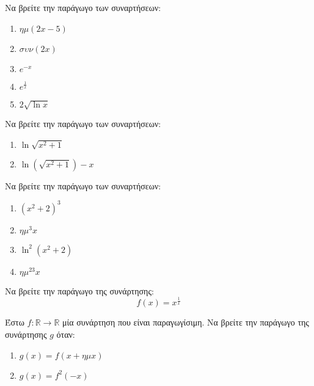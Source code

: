 \documentclass{presentation}
\begin{document}
\begin{askisi}
  Να βρείτε την παράγωγο των συναρτήσεων:
  \begin{enumerate}
    \item<1-> $ημ(2x-5)$
    \item<2-> $συν(2x)$
    \item<3-> $e^{-x}$
    \item<4-> $e^{\frac{1}{x}}$
    \item<5-> $2\sqrt{\ln x}$
  \end{enumerate}

\end{askisi}

\begin{askisi}
  Να βρείτε την παράγωγο των συναρτήσεων:
  \begin{enumerate}
    \item<1-> $\ln \sqrt{x^2+1}$
    \item<2-> $\ln(\sqrt{x^2+1})-x$
  \end{enumerate}

\end{askisi}

\begin{askisi}
  Να βρείτε την παράγωγο των συναρτήσεων:
  \begin{enumerate}
    \item<1-> $(x^2+2)^3$
    \item<2-> $ημ^3x$
    \item<3-> $\ln^2(x^2+2)$
    \item<4-> $ημ^23x$
  \end{enumerate}

\end{askisi}

\begin{askisi}
  Να βρείτε την παράγωγο της συνάρτησης:
  $$f(x)=x^{\frac{1}{x}}$$

\end{askisi}

\begin{askisi}
  Έστω $f:\mathbb{R}\to\mathbb{R}$ μία συνάρτηση που είναι παραγωγίσιμη. Να βρείτε την παράγωγο της συνάρτησης $g$ όταν:
  \begin{enumerate}
    \item<1-> $g(x)=f(x+ημx)$
    \item<2-> $g(x)=f^2(-x)$
  \end{enumerate}

\end{askisi}
\end{document}

